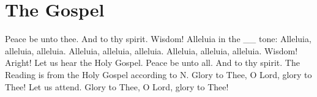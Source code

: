 \section{The Gospel}

\begin{liturgicaltext}
    \priest Peace be unto thee.
    \reader And to thy spirit.
    \deacon Wisdom!
    \reader Alleluia in the \_\_ tone: 
    \choir Alleluia, alleluia, alleluia.
    \reader {}
    \choir Alleluia, alleluia, alleluia.
    \reader {}
    \choir Alleluia, alleluia, alleluia.
    \deacon Wisdom! Aright! Let us hear the Holy Gospel.
    \priest Peace be unto all.
    \choir And to thy spirit.
    \deacon The Reading is from the Holy Gospel according to N.
    \choir Glory to Thee, O Lord, glory to Thee!
    \priest Let us attend.
    \deacon {}
    \choir Glory to Thee, O Lord, glory to Thee!
\end{liturgicaltext}